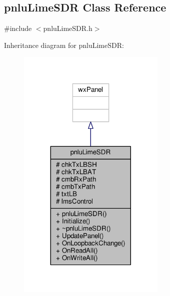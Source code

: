 \subsection{pnlu\+Lime\+S\+DR Class Reference}
\label{classpnluLimeSDR}


{\ttfamily \#include $<$pnlu\+Lime\+S\+D\+R.\+h$>$}



Inheritance diagram for pnlu\+Lime\+S\+DR\+:
\nopagebreak
\begin{figure}[H]
\begin{center}
\leavevmode
\includegraphics[width=200pt]{d2/d45/classpnluLimeSDR__inherit__graph}
\end{center}
\end{figure}


